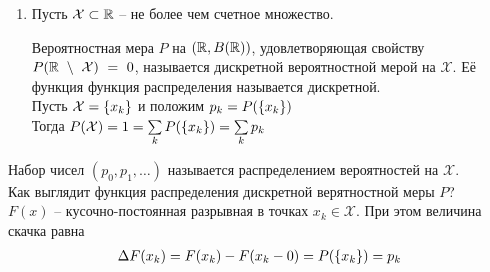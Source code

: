 
\begin{enumerate}[label=\protect\circled{\arabic*},series=distributions]
	\item 

		Пусть $\mathcal{X} \subset \mathbb{R}$ -- не более чем счетное множество.
		\begin{definition}
			Вероятностная мера $P$ на $(\mathbb{R}, B(\mathbb{R}))$, 
			удовлетворяющая свойству $P(\mathbb{R}~\setminus~\mathcal{X})~=~0$, 
			называется дискретной вероятностной мерой на $\mathcal{X}$. 
			Её функция функция распределения называется дискретной.\\
			Пусть $\mathcal{X} = \left\{ x_k \right\}$ и положим $p_k = P(\left\{ x_k \right\})$\\
			Тогда $P(\mathcal{X}) = 1 = \sum\limits_{k} P(\left\{ x_k \right\}) = \sum\limits_k p_k$
		\end{definition}
\end{enumerate}

\begin{definition}
	Набор чисел $(p_0, p_1, \ldots)$ называется распределением вероятностей на $\mathcal{X}$.\\
	
	Как выглядит функция распределения дискретной верятностной меры $P$?\\
	$F(x)$ -- кусочно-постоянная разрывная в точках $x_k \in \mathcal{X}$. 
	При этом величина скачка равна
	\begin{align*}
		\Delta F(x_k) = F(x_k) - F(x_k - 0) = P(\left\{ x_k \right\}) = p_k
	\end{align*}
\end{definition}


